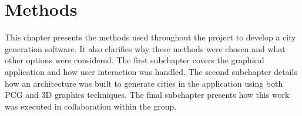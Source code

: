 \chapter{Methods}

This chapter presents the methods used throughout the project to develop a city generation software.
It also clarifies why these methods were chosen and what other options were considered.
The first subchapter covers the graphical application and how user interaction was handled.
The second subchapter details how an architecture was built to generate cities in the application using both PCG and 3D graphics techniques.
The final subchapter presents how this work was executed in collaboration within the group.



